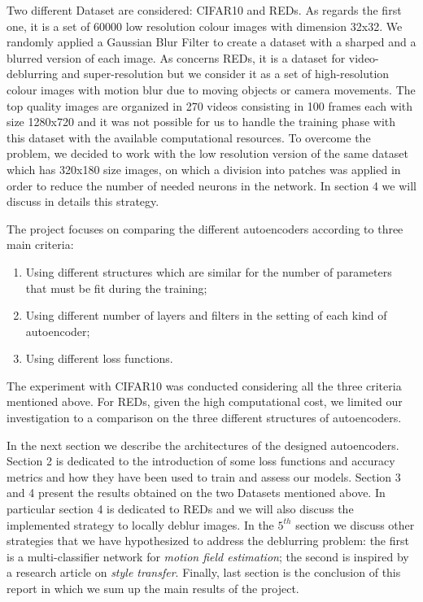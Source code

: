 \documentclass[12pt,a4paper]{report}
\begin{document}
Two different Dataset are considered: CIFAR10 and REDs. As regards the first one, it is a set of 60000 low resolution colour images with dimension 32x32. We randomly applied a Gaussian Blur Filter to create a dataset with a sharped and a blurred version of each image. As concerns REDs, it is a dataset for video-deblurring and super-resolution but we consider it as a set of high-resolution colour images with motion blur due to moving objects or camera movements. The top quality images are organized in 270 videos consisting in 100 frames each with size 1280x720 and it was not possible for us to handle the training phase with this dataset with the available computational resources. To overcome the problem, we decided to work with the low resolution version of the same dataset which has 320x180 size images, on which a division into patches was applied in order to reduce the number of needed neurons in the network. In section 4 we will discuss in details this strategy.

The project focuses on comparing the different autoencoders according to three main criteria:
\begin{enumerate}
\item Using different structures which are similar for the number of parameters that must be fit during the training;
\item Using different number of layers and filters in the setting of each kind of autoencoder;
\item Using different loss functions.
\end{enumerate}

The experiment with CIFAR10 was conducted considering all the three criteria mentioned above. For REDs, given the high computational cost, we limited our investigation to a comparison on the three different structures of autoencoders.

In the next section we describe the architectures of the designed autoencoders. Section 2 is dedicated to the introduction of some loss functions and accuracy metrics and how they have been used to train and assess our models. Section 3 and 4 present the results obtained on the two Datasets mentioned above. In particular section 4 is dedicated to REDs and we will also discuss the implemented strategy to locally deblur images. In the $5^{th}$ section we discuss other strategies that we have hypothesized to address the deblurring problem: the first is a multi-classifier network for \textit{motion field estimation}; the second is inspired by a research article\cite{G&E&B} on \textit{style transfer}. Finally, last section is the conclusion of this report in which we sum up the main results of the project.
 
\end{document}

